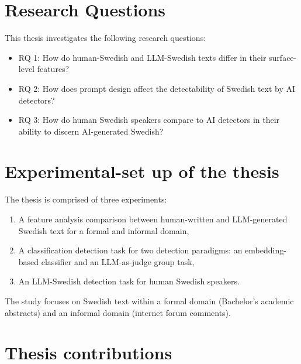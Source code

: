 \documentclass[thesis]{cluu}
\begin{document}
\section{Research Questions}
This thesis investigates the following research questions:
\begin{itemize}

\item RQ 1: How do human-Swedish and LLM-Swedish texts differ in their surface-level features?

\item RQ 2: How does prompt design affect the detectability of Swedish text by AI detectors?

\item RQ 3: How do human Swedish speakers compare to AI detectors in their ability to discern AI-generated Swedish?

\end{itemize}

\section{Experimental-set up of the thesis}

The thesis is comprised of three experiments:

\begin{enumerate}
    \item A feature analysis comparison between human-written and LLM-generated Swedish text for a formal and informal domain,
    \item A classification detection task for two detection paradigms: an embedding-based classifier and an LLM-as-judge group task,
    \item An LLM-Swedish detection task for human Swedish speakers.
\end{enumerate}

The study focuses on Swedish text within a formal domain (Bachelor's academic abstracts) and an informal domain (internet forum comments).

\section{Thesis contributions}
\end{document}

